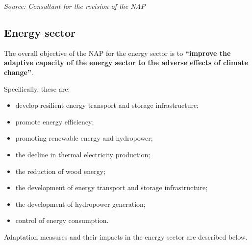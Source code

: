 \documentclass[
]{book}
\begin{document}
\emph{Source: Consultant for the revision of the NAP}

\subsection{Energy sector}\label{energy-sector}

The overall objective of the NAP for the energy sector is to \textbf{``improve the adaptive capacity of the energy sector to the adverse effects of climate change''}.

Specifically, these are:

\begin{itemize}
\item
  develop resilient energy transport and storage infrastructure;
\item
  promote energy efficiency;
\item
  promoting renewable energy and hydropower;
\item
  the decline in thermal electricity production;
\item
  the reduction of wood energy;
\item
  the development of energy transport and storage infrastructure;
\item
  the development of hydropower generation;
\item
  control of energy consumption.
\end{itemize}

Adaptation measures and their impacts in the energy sector are described below.
\end{document}
